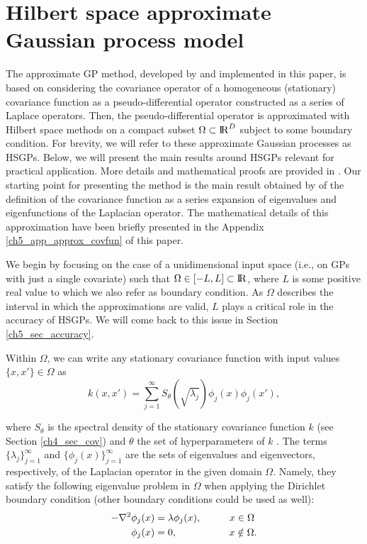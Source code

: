 \documentclass[onecolumn,a4paper,11pt]{article}
\begin{document}
\section{Hilbert space approximate Gaussian process model}\label{ch5_sec_method}

The approximate GP method, developed by \cite{solin2018hilbert} and implemented in this paper, is based on considering the covariance operator of a homogeneous (stationary) covariance function as a pseudo-differential operator constructed as a series of Laplace operators. Then, the pseudo-differential operator is approximated with Hilbert space methods on a compact subset $\Omega \subset {\rm I\!R}^D$ subject to some boundary condition. For brevity, we will refer to these approximate Gaussian processes as HSGPs. Below, we will present the main results around HSGPs relevant for practical application. More details and mathematical proofs are provided in \cite{solin2018hilbert}. Our starting point for presenting the method is the main result obtained by \cite{solin2018hilbert} of the definition of the covariance function as a series expansion of eigenvalues and eigenfunctions of the Laplacian operator. The mathematical details of this approximation have been briefly presented in the Appendix \ref{ch5_app_approx_covfun} of this paper.

We begin by focusing on the case of a unidimensional input space (i.e., on GPs with just a single covariate) such that $\Omega \in [-L,L] \subset {\rm I\!R}$, where $L$ is some positive real value to which we also refer as boundary condition. As $\Omega$ describes the interval in which the approximations are valid, $L$ plays a critical role in the accuracy of HSGPs. We will come back to this issue in Section \ref{ch5_sec_accuracy}.

Within $\Omega$, we can write any stationary covariance function with input values $\{x,x'\} \in \Omega$ as
%
\begin{equation}\label{eq_approxcov}
k(x,x') = \sum_{j=1}^\infty S_{\theta}(\sqrt{\lambda_j}) \phi_j(x) \phi_j(x'),
\end{equation} 

\noindent where $S_{\theta}$ is the spectral density of the stationary covariance function $k$ (see Section \ref{ch4_sec_cov}) and $\theta$ the set of hyperparameters of $k$ \citep{rasmussen2006gaussian}. The terms $\{\lambda_j\}_{j=1}^{\infty}$ and $\{\phi_j(x)\}_{j=1}^{\infty}$ are the sets of eigenvalues and eigenvectors, respectively, of the Laplacian operator in the given domain $\Omega$. Namely, they satisfy the following eigenvalue problem in $\Omega$ when applying the Dirichlet boundary condition (other boundary conditions could be used as well):
%
\begin{align}\label{eq_eigenproblem}
\begin{split}
-\nabla^2 \phi_j(x)&=\lambda \phi_j(x), \hspace{1cm}  x \in \Omega \\ 
\phi_j(x)&= 0, \hspace{1.85cm}   x \notin \Omega.
\end{split}
\end{align} 
\end{document}
